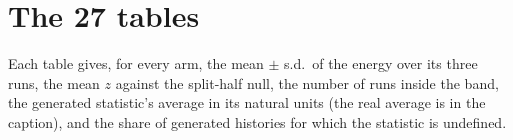 \documentclass[11pt]{article}
\begin{document}
\section{The 27 tables}

Each table gives, for every arm, the mean $\pm$ s.d.\ of the energy over its
three runs, the mean $z$ against the split-half null, the number of runs inside
the band, the generated statistic's average in its natural units (the real
average is in the caption), and the share of generated histories for which the
statistic is undefined.

\bigskip

\end{document}
